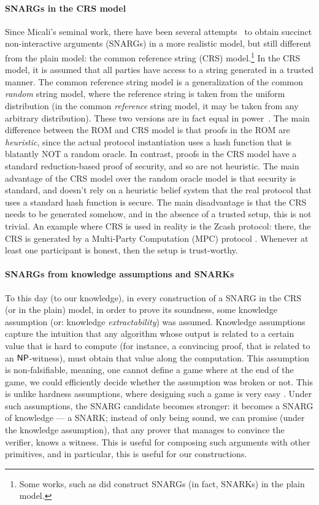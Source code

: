 \paragraph{SNARGs in the CRS model}
Since Micali's seminal work, there have been several attempts~\cite{aiello2000fast, dwork2004succinct, di2008succinct, groth2010short, bitansky2012extractable} to obtain succinct non-interactive arguments (SNARGs) in a more realistic model, but still different from the plain model: the common reference string (CRS) model.\footnote{
Some works, such as \cite{bitansky2013recursive} did construct SNARGs (in fact, SNARKs) in the plain model.
} In the CRS model, it is assumed that all parties have access to a string generated in a trusted manner. The common reference string model is a generalization of the common \emph{random} string model, where the reference string is taken from the uniform distribution (in the common \emph{reference} string model, it may be taken from any arbitrary distribution). These two versions are in fact equal in power~\cite{canetti2001universally}. The main difference between the ROM and CRS model is that proofs in the ROM are \emph{heuristic}, since the actual protocol instantiation uses a hash function that is blatantly NOT a random oracle. In contrast, proofs in the CRS model have a standard reduction-based proof of security, and so are not heuristic. The main advantage of the CRS model over the random oracle model is that security is standard, and doesn't rely on a heuristic belief system that the real protocol that uses a standard hash function is secure. The main disadvantage is that the CRS needs to be generated somehow, and in the absence of a trusted setup, this is not trivial. An example where CRS is used in reality is the Zcash protocol: there, the CRS is generated by a Multi-Party Computation (MPC) protocol \cite{crsZkSnark}. Whenever at least  one participant is honest, then the setup is trust-worthy.

\paragraph{SNARGs from knowledge assumptions and SNARKs}
To this day (to our knowledge), in every construction of a SNARG in the CRS (or in the plain) model, in order to prove its soundness, some knowledge assumption (or: knowledge \emph{extractability}) was assumed. Knowledge assumptions capture the intuition that any algorithm whose output is related to a certain value that is hard to compute (for instance, a convincing proof, that is related to an ${\mathsf{NP}}$-witness), must obtain that value along the computation. This assumption is non-falsifiable, meaning, one cannot define a game where at the end of the game, we could efficiently decide whether the assumption was broken or not. This is unlike hardness assumptions, where designing such a game is very easy . Under such assumptions, the SNARG candidate becomes stronger: it becomes a SNARG of knowledge --- a SNARK; instead of only being sound, we can promise (under the knowledge assumption), that any prover that manages to convince the verifier, knows a witness. This is useful for composing such arguments with other primitives, and in particular, this is useful for our constructions.

